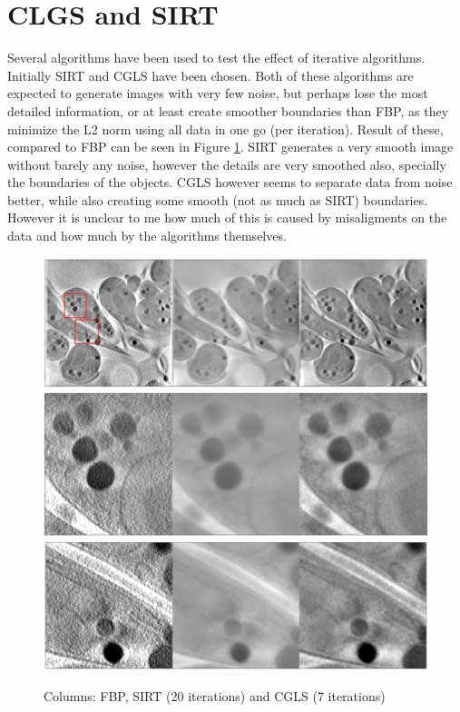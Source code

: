 \documentclass[11pt]{report}
\begin{document}
\pagebreak
\chapter*{CLGS and SIRT}
Several algorithms have been used to test the effect of iterative algorithms. Initially SIRT and CGLS have been chosen. Both of these algorithms are expected to generate images with very few noise, but perhaps lose the most detailed information, or at least create smoother boundaries than FBP, as they minimize the L2 norm using all data in one go (per iteration). Result of these, compared to FBP can be seen in Figure \ref{fig:CGLSSIRT}. SIRT generates a very smooth image without barely any noise, however the details are very smoothed also, specially the boundaries of the objects. CGLS however seems to separate data from noise better, while also creating some smooth (not as much as SIRT) boundaries. However it is unclear to me how much of this is caused by misaligments on the data and how much by the algorithms themselves.



\begin{figure}
\begin{center}

\includegraphics[width=\textwidth]{FBP_SIRT_CGLSm.png} 
\includegraphics[width=\textwidth]{FBP_SIRT_CGLSz1.png} 
\includegraphics[width=\textwidth]{FBP_SIRT_CGLSz2.png} 

\end{center}

\caption{\label{fig:CGLSSIRT}Columns: FBP, SIRT (20 iterations) and CGLS (7 iterations)} 
\end{figure}
\end{document}
